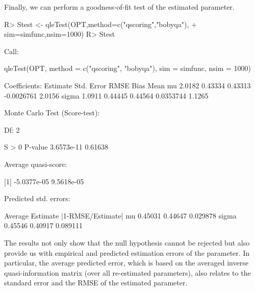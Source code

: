 \documentclass[article, nojss]{jss}
\numberwithin{equation}{section}			%
\begin{document}
Finally, we can perform a goodness-of-fit test of the estimated parameter.
\begin{Schunk}
\begin{Sinput}
R> Stest <- qleTest(OPT,method=c("qscoring","bobyqa"),
+ 		   sim=simfunc,nsim=1000)
R> Stest
\end{Sinput}
\begin{Soutput}
Call:

qleTest(OPT, method = c("qscoring", "bobyqa"), sim = simfunc, 
    nsim = 1000)

Coefficients:
       Estimate  Std. Error  RMSE     Bias        Mean  
mu     2.0182    0.43334     0.43313  -0.0026761  2.0156
sigma  1.0911    0.44445     0.44564   0.0353744  1.1265


Monte Carlo Test (Score-test):

  Df: 2 

     S > 0     P-value  
3.6573e-11     0.61638  


Average quasi-score: 

[1]  -5.0377e-05   9.5618e-05


Predicted std. errors: 

       Average  Estimate  |1-RMSE/Estimate|
mu     0.45031  0.44647   0.029878         
sigma  0.45546  0.40917   0.089111         
\end{Soutput}
\end{Schunk}
The results not only show that the null hypothesis cannot be rejected but also
provide us with empirical and predicted estimation errors of the parameter.
In particular, the average predicted error, which is based on the averaged
inverse quasi-information matrix (over all re-estimated parameters),
also relates to the standard error and the RMSE of the estimated parameter.
%
\end{document}
